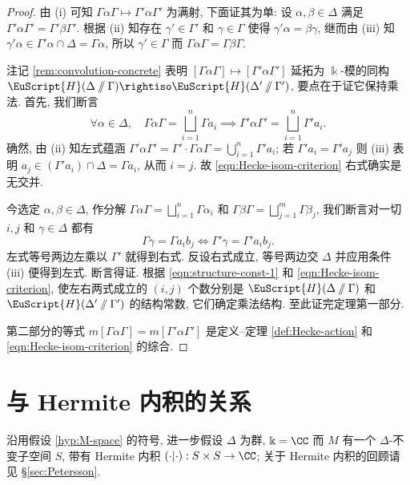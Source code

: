 \begin{proof}
	由 (i) 可知 $\Gamma\alpha\Gamma \mapsto \Gamma' \alpha\Gamma'$ 为满射, 下面证其为单: 设 $\alpha,\beta \in \Delta$ 满足 $\Gamma'\alpha\Gamma' = \Gamma'\beta\Gamma'$. 根据 (ii) 知存在 $\gamma' \in \Gamma'$ 和 $\gamma \in \Gamma$ 使得 $\gamma'\alpha = \beta\gamma$, 继而由 (iii) 知 $\gamma'\alpha \in \Gamma'\alpha \cap \Delta = \Gamma\alpha$, 所以 $\gamma' \in \Gamma$ 而 $\Gamma\alpha\Gamma = \Gamma\beta\Gamma$.
	
	注记 \ref{rem:convolution-concrete} 表明 $[\Gamma\alpha\Gamma] \mapsto [\Gamma'\alpha\Gamma']$ 延拓为 $\Bbbk$-模的同构 $\EuScript{H}(\Delta \sslash \Gamma) \rightiso \EuScript{H}(\Delta' \sslash \Gamma')$, 要点在于证它保持乘法. 首先, 我们断言
	\begin{equation}\label{eqn:Hecke-isom-criterion}
		\forall \alpha \in \Delta, \quad \Gamma \alpha \Gamma = \bigsqcup_{i=1}^n \Gamma a_i \implies \Gamma' \alpha \Gamma' = \bigsqcup_{i=1}^n \Gamma' a_i.
	\end{equation}
	确然, 由 (ii) 知左式蕴涵 $\Gamma' \alpha \Gamma' = \Gamma' \cdot \Gamma\alpha\Gamma = \bigcup_{i=1}^n \Gamma' a_i$; 若 $\Gamma' a_i = \Gamma' a_j$ 则 (iii) 表明 $a_j \in (\Gamma' a_i) \cap \Delta = \Gamma a_i$, 从而 $i=j$. 故 \eqref{eqn:Hecke-isom-criterion} 右式确实是无交并.
	
	今选定 $\alpha, \beta \in \Delta$, 作分解 $\Gamma\alpha\Gamma = \bigsqcup_{i=1}^n \Gamma \alpha_i$ 和 $\Gamma\beta\Gamma = \bigsqcup_{j=1}^m \Gamma\beta_j$, 我们断言对一切 $i, j$ 和 $\gamma \in \Delta$ 都有
	\[ \Gamma \gamma = \Gamma a_i b_j \iff \Gamma' \gamma = \Gamma' a_i b_j. \]
	左式等号两边左乘以 $\Gamma'$ 就得到右式. 反设右式成立, 等号两边交 $\Delta$ 并应用条件 (iii) 便得到左式. 断言得证. 根据 \eqref{eqn:structure-const-1} 和 \eqref{eqn:Hecke-isom-criterion}, 使左右两式成立的 $(i,j)$ 个数分别是 $\EuScript{H}(\Delta \sslash \Gamma)$ 和 $\EuScript{H}(\Delta' \sslash \Gamma')$ 的结构常数, 它们确定乘法结构. 至此证完定理第一部分.
	
	第二部分的等式 $m [\Gamma \alpha \Gamma] = m[\Gamma'\alpha\Gamma']$ 是定义--定理 \ref{def:Hecke-action} 和 \eqref{eqn:Hecke-isom-criterion} 的综合.
\end{proof}

\section{与 Hermite 内积的关系}\label{sec:Hermitian-form}
沿用假设 \ref{hyp:M-space} 的符号, 进一步假设 $\Delta$ 为群, $\Bbbk=\CC$ 而 $M$ 有一个 $\Delta$-不变子空间 $S$, 带有 Hermite 内积 $\innerp{\cdot}{\cdot}: S \times S \to \CC$; 关于 Hermite 内积的回顾请见 \S\ref{sec:Petersson}.

